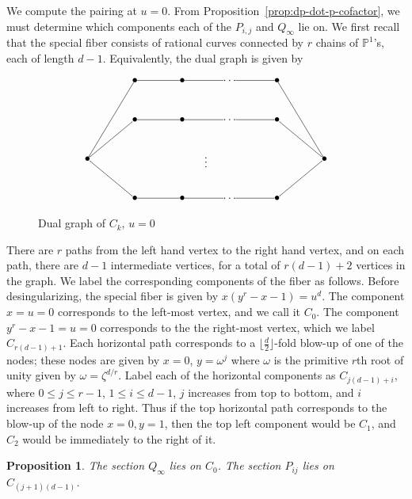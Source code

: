 \documentclass[pagesize,paper=letter]{scrartcl}
\newtheorem{proposition}[thm]{Proposition}
\theoremstyle{definition}
\theoremstyle{remark}
\def\Pro{\ensuremath{\mathbb{P}}}
\begin{document}
We compute the pairing at $u = 0$. From Proposition~\ref{prop:dp-dot-p-cofactor}, we must determine which components each of the $P_{i,j}$ and $Q_\infty$ lie on. We first recall that the special fiber consists of rational curves connected by $r$ chains of $\Pro^1$'s, each of length $d-1$. Equivalently, the dual graph is given by
\begin{figure}[h]\centering
  \[
\xygraph{
  !{<0cm,0cm>;<1.5cm,0cm>:<0cm,1.25cm>::}
  !{(0, 2) }*{\bullet}="c0"
  !{(5, 2) }*{\bullet}="clast"
  !{(1, 4) }*{\bullet}="c11"
  !{(2, 4) }*{\bullet}="c12"
  !{(3, 4) }*{\dots}="c1dots"
  !{(4, 4) }*{\bullet}="c1last"
  !{(1, 3) }*{\bullet}="c21"
  !{(2, 3) }*{\bullet}="c22"
  !{(3, 3) }*{\dots}="c2dots"
  !{(4, 3) }*{\bullet}="c2last"
  !{(2.5, 2) }*{\vdots}
  !{(1, 1) }*{\bullet}="cr1"
  !{(2, 1) }*{\bullet}="cr2"
  !{(3, 1) }*{\dots}="crdots"
  !{(4, 1) }*{\bullet}="crlast"
  "c0"-"c11"
  "c11"-"c12"
  "c12"-"c1dots"
  "c1dots"-"c1last"
  "c1last"-"clast"
  "c0"-"c21"
  "c21"-"c22"
  "c22"-"c2dots"
  "c2dots"-"c2last"
  "c2last"-"clast"
  "c0"-"cr1"
  "cr1"-"cr2"
  "cr2"-"crdots"
  "crdots"-"crlast"
  "crlast"-"clast"
}
\]
  \caption{Dual graph of $C_k$, $u=0$}
\label{fig:u-equals-zero}
\end{figure}
There are $r$ paths from the left hand vertex to the right hand vertex, and on each path, there are $d-1$ intermediate vertices, for a total of $r(d-1) + 2$ vertices in the graph. We label the corresponding components of the fiber as follows. Before desingularizing, the special fiber is given by $x(y^r - x - 1) = u^d$. The component $x = u = 0$ corresponds to the left-most vertex, and we call it $C_0$. The component $y^r - x - 1 = u = 0$ corresponds to the the right-most vertex, which we label $C_{r(d-1)+1}$. Each horizontal path corresponds to a $\lfloor \frac{d}{2}\rfloor$-fold blow-up of one of the nodes; these nodes are given by $x = 0$, $y = \omega^j$ where $\omega$ is the primitive $r$th root of unity given by $\omega = \zeta^{d/r}$. Label each of the horizontal components as $C_{j(d-1) + i}$, where $0 \leq j \leq r-1$, $1 \leq i \leq d-1$, $j$ increases from top to bottom, and $i$ increases from left to right. Thus if the top horizontal path corresponds to the blow-up of the node $x = 0, y = 1$, then the top left component would be $C_1$, and $C_2$ would be immediately to the right of it.

\begin{proposition}
  The section $Q_\infty$ lies on $C_0$. The section $P_{ij}$ lies on $C_{(j+1)(d-1)}$.
\end{proposition}
\end{document}
